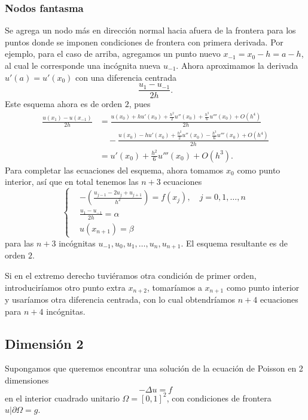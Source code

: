 \documentclass[11pt,letterpaper]{report}
\begin{document}
\subsubsection{Nodos fantasma}
Se agrega un nodo más en dirección normal hacia afuera de la frontera
para los puntos donde se imponen condiciones de frontera con primera
derivada. Por ejemplo, para el caso de arriba, agregamos un punto
nuevo $x_{-1}=x_0-h=a-h$, al cual le corresponde una incógnita nueva
$u_{-1}$. Ahora aproximamos la derivada $u'(a)=u'(x_0)$ con una
diferencia centrada
\begin{equation}
  \frac{u_{1}-u_{-1}}{2h}
.\end{equation}
Este esquema ahora es de orden $2$, pues
\begin{align}
  \frac{u(x_1)-u(x_{-1})}{2h}
  &=
  \frac{
    u(x_0)+hu'(x_0)+\frac{h^{2}}{2}u''(x_0)+\frac{h^{3}}{6}u'''(x_0)
    +O(h^{4})
  }{2h} \\
  &\quad -
  \frac{
    u(x_0)-hu'(x_0)+\frac{h^{2}}{2}u''(x_0)-\frac{h^{3}}{6}u'''(x_0)
    +O(h^{4})
  }{2h} \\
  &= u'(x_0)+\frac{h^{2}}{6}u'''(x_0) +O(h^{3})
.\end{align}
Para completar las ecuaciones del esquema, ahora tomamos $x_0$ como
punto interior, así que en total tenemos las $n+3$ ecuaciones
\begin{equation}
  \left\{
    \begin{aligned}
      &- \left( \frac{u_{j-1}-2u_j+u_{j+1}}{h^{2}} \right)
        =
        f(x_j), \quad j=0,1,\dots,n
      \\
      &\frac{u_{1}-u_{-1}}{2h} = \alpha
      \\
      &u(x_{n+1})=\beta
    \end{aligned}
  \right.
\end{equation}
para las $n+3$ incógnitas $u_{-1},u_0,u_1,\dots,u_n,u_{n+1}$.
El esquema resultante es de orden $2$.

Si en el extremo derecho tuviéramos otra condición de primer orden,
introduciríamos otro punto extra $x_{n+2}$, tomaríamos a $x_{n+1}$
como punto interior y usaríamos otra diferencia centrada, con lo cual
obtendríamos $n+4$ ecuaciones para $n+4$ incógnitas.

\subsection{Dimensión 2}

Supongamos que queremos encontrar una solución de la ecuación de
Poisson en 2 dimensiones
\begin{equation}
  -\Delta u = f
\end{equation}
en el interior cuadrado unitario $\Omega=[0,1]^{2}$, con condiciones
de frontera $u|\partial\Omega = g$.
\end{document}
